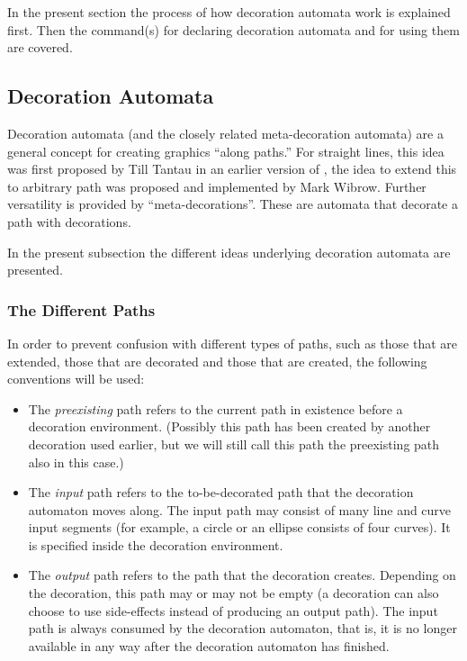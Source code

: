 In the present section the process of how decoration automata work is
explained first. Then the command(s) for declaring decoration automata
and for using them are covered.



\subsection{Decoration Automata}

Decoration automata (and the closely related meta-decoration automata)
are a general concept for creating graphics ``along paths.'' For
straight lines, this idea was first proposed by Till Tantau in an
earlier version of \pgfname, the idea to extend this to arbitrary path
was proposed and implemented by Mark Wibrow. Further versatility is
provided by ``meta-decorations''. These are automata that decorate a
path with decorations.

In the present subsection the different ideas underlying decoration
automata are presented.



\subsubsection{The Different Paths}

In order to prevent confusion with different types of paths, such
as those that are extended, those that are decorated and those that
are created, the following conventions will be used:

\begin{itemize}
\item
  The \emph{preexisting} path refers to the current path in existence
  before a decoration environment. (Possibly this path has been
  created by another decoration used earlier, but we will still call
  this path the preexisting path also in this case.)
\item
  The \emph{input} path refers to the to-be-decorated path that the
  decoration automaton moves along. The input path may consist of many
  line and curve input segments (for example, a circle or an ellipse
  consists of four curves). It is specified inside the decoration
  environment.
\item
  The \emph{output} path refers to the path that the decoration
  creates. Depending on the decoration, this path may or may not be
  empty (a decoration can also choose to use side-effects instead of
  producing an output path). The input path is always consumed by the
  decoration automaton, that is, it is no longer available in any way
  after the decoration automaton has finished.
\end{itemize}

